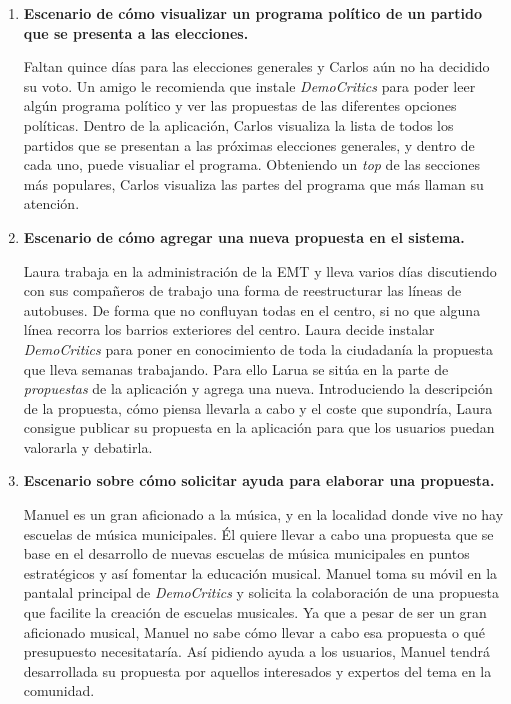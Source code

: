 \begin{enumerate}[label=\textbf{\Roman*}]

\item \textbf{Escenario de cómo visualizar un programa político de un partido que se presenta a las elecciones.}

Faltan quince días para las elecciones generales y Carlos aún no ha decidido su voto. Un amigo le recomienda que instale \textit{DemoCritics} para poder leer algún programa político y ver las propuestas de las diferentes opciones políticas. Dentro de la aplicación, Carlos visualiza la lista de todos los partidos que se presentan a las próximas elecciones generales, y dentro de cada uno, puede visualiar el programa. Obteniendo un \textit{top} de las secciones más populares, Carlos visualiza las partes del programa que más llaman su atención.

\item \textbf{Escenario de cómo agregar una nueva propuesta en el sistema.}

Laura trabaja en la administración de la EMT y lleva varios días discutiendo con sus compañeros de trabajo una forma de reestructurar las líneas de autobuses. De forma que no confluyan todas en el centro, si no que alguna línea recorra los barrios exteriores del centro. Laura decide instalar \textit{DemoCritics} para poner en conocimiento de toda la ciudadanía la propuesta que lleva semanas trabajando. Para ello Larua se sitúa en la parte de \textit{propuestas} de la aplicación y agrega una nueva. Introduciendo la descripción de la propuesta, cómo piensa llevarla a cabo y el coste que supondría, Laura consigue publicar su propuesta en la aplicación para que los usuarios puedan valorarla y debatirla.

\item \textbf{Escenario sobre cómo solicitar ayuda para elaborar una propuesta.}

Manuel es un gran aficionado a la música, y en la localidad donde vive no hay escuelas de música municipales. Él quiere llevar a cabo una propuesta que se base en el desarrollo de nuevas escuelas de música municipales en puntos estratégicos y así fomentar la educación musical. Manuel toma su móvil en la pantalal principal de \textit{DemoCritics} y solicita la colaboración de una propuesta que facilite la creación de escuelas musicales. Ya que a pesar de ser un gran aficionado musical, Manuel no sabe cómo llevar a cabo esa propuesta o qué presupuesto necesitataría. Así pidiendo ayuda a los usuarios, Manuel tendrá desarrollada su propuesta por aquellos interesados y expertos del tema en la comunidad.


\end{enumerate}

